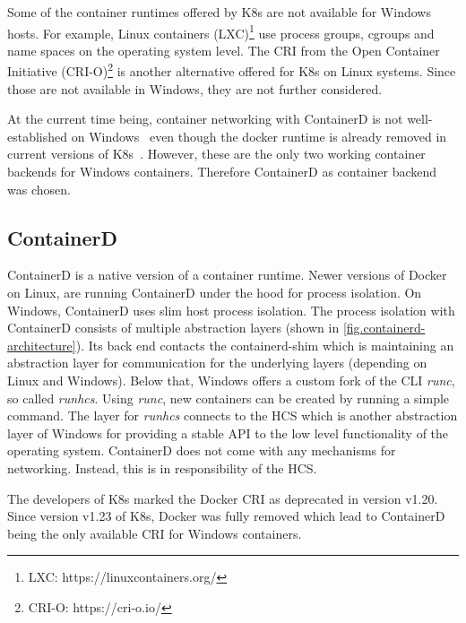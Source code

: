 Some of the container runtimes offered by \ac{K8s} are not available for \ac{Windows} hosts. For example, Linux containers (LXC)\footnote{LXC: https://linuxcontainers.org/} use process groups, \acp{cgroup} and name spaces on the operating system level.
The \ac{CRI} from the Open Container Initiative (CRI-O)\footnote{CRI-O: https://cri-o.io/} is another alternative offered for \ac{K8s} on Linux systems. Since those are not available in \ac{Windows}, they are not further considered.

At the current time being, container networking with ContainerD is not well-established on \ac{Windows}~\cite{GitHub.20230202,GitHub.20230202b,Github.2022_258,GitHub.20230202c} even though the docker runtime is already removed in current versions of \ac{K8s}~\cite{Kubernetes.2020}. However, these are the only two working container backends for \ac{Windows} containers. Therefore ContainerD as container backend was chosen.

\subsection{ContainerD}
ContainerD is a native version of a container runtime. Newer versions of Docker on Linux, are running ContainerD under the hood for process isolation. On \ac{Windows}, ContainerD uses slim host process isolation.  The process isolation with ContainerD consists of multiple abstraction layers (shown in \autoref{fig.containerd-architecture}). Its back end contacts the containerd-shim which is maintaining an abstraction layer for communication for the underlying layers (depending on Linux and \ac{Windows}). Below that, \ac{Windows} offers a custom fork of the \ac{CLI} \textit{runc}, so called \textit{runhcs}\cite{Scooley.2022}. Using \textit{runc}, new containers can be created by running a simple command\cite{Scooley.2022}. The layer for \textit{runhcs} connects to the \ac{HCS} which is another abstraction layer of \ac{Windows} for providing a stable \ac{API} to the low level functionality of the operating system\cite{Microsoft.2017}. ContainerD does not come with any mechanisms for networking. Instead, this is in responsibility of the \ac{HCS}.

The developers of \ac{K8s} marked the Docker \ac{CRI} as deprecated in version v1.20\cite{Kubernetes.2020}. Since version v1.23 of \ac{K8s}, Docker was fully removed which lead to ContainerD being the only available \ac{CRI} for \ac{Windows} containers.

